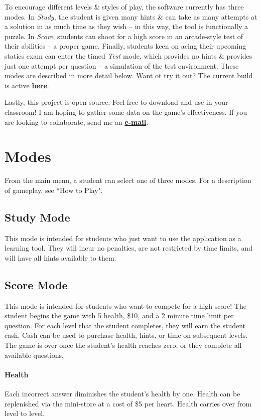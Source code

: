 \documentclass[12pt]{article}
\let\oldhref\href
\renewcommand{\href}[2]{\oldhref{#1}{\bfseries#2}}
\begin{document}
To encourage different levels \& styles of play, the software currently has three modes. In \emph{Study}, the student is given many hints \& can take as many attempts at a solution in as much time as they wish -- in this way, the tool is functionally a puzzle. In \emph{Score}, students can shoot for a high score in an arcade-style test of their abilities -- a proper game. Finally, students keen on acing their upcoming statics exam can enter the timed \emph{Test} mode, which provides no hints \& provides just one attempt per question -- a simulation of the test environment. These modes are described in more detail below. Want ot try it out? The current build is active \href{https://hartery5.github.io/FBDGame/}{here}.\par

Lastly, this project is open source. Feel free to download and use in your classroom! I am hoping to gather some data on the game's effectiveness. If you are looking to collaborate, send me an \href{mailto:sean.hartery@dal.ca}{\textbf{e-mail}}.

\section{Modes}
From the main menu, a student can select one of three modes. For a description of gameplay, see ``How to Play".

\subsection{Study Mode}
This mode is intended for students who just want to use the application as a learning tool. They will incur no penalties, are not restricted by time limits, and will have all hints available to them.

\subsection{Score Mode}
This mode is intended for students who want to compete for a high score! The student begins the game with 5 health, \$10, and a 2 minute time limit per question. For each level that the student completes, they will earn the student cash. Cash can be used to purchase health, hints, or time on subsequent levels. The game is over once the student's health reaches zero, or they complete all available questions.

\paragraph{Health}
Each incorrect answer diminishes the student's health by one. Health can be replenished via the mini-store at a cost of \$5 per heart. Health carries over from level to level.
\end{document}
